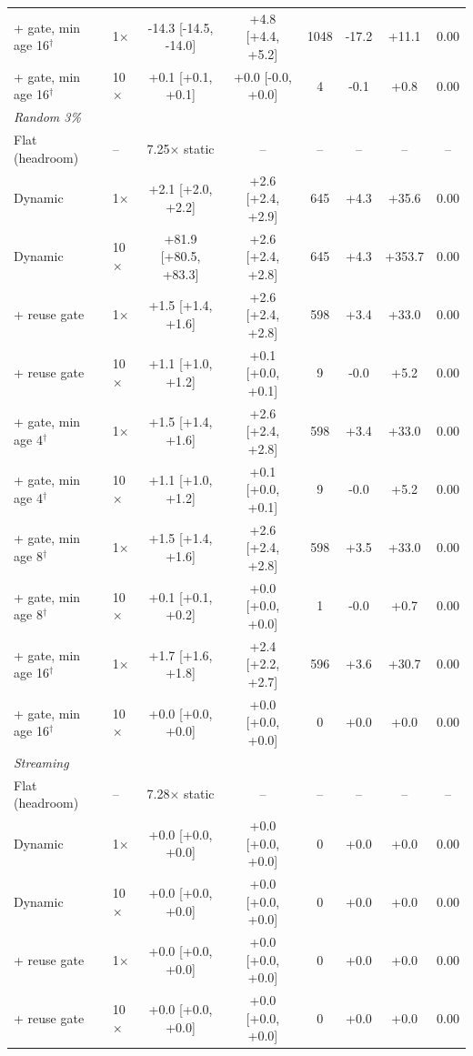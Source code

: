 \begin{table}[h]
\begin{tabular}{llcccccc}
\quad + gate, min age 16$^\dagger$ & 1$\times$ & -14.3 [-14.5, -14.0] & +4.8 [+4.4, +5.2] & 1048 & -17.2 & +11.1 & 0.00\\
\quad + gate, min age 16$^\dagger$ & 10$\times$ & +0.1 [+0.1, +0.1] & +0.0 [-0.0, +0.0] & 4 & -0.1 & +0.8 & 0.00\\
\midrule
\multicolumn{8}{l}{\textit{Random 3\%}}\\
\quad Flat (headroom) & -- & 7.25$\times$ static & -- & -- & -- & -- & --\\
\quad Dynamic & 1$\times$ & +2.1 [+2.0, +2.2] & +2.6 [+2.4, +2.9] & 645 & +4.3 & +35.6 & 0.00\\
\quad Dynamic & 10$\times$ & +81.9 [+80.5, +83.3] & +2.6 [+2.4, +2.8] & 645 & +4.3 & +353.7 & 0.00\\
\quad + reuse gate & 1$\times$ & +1.5 [+1.4, +1.6] & +2.6 [+2.4, +2.8] & 598 & +3.4 & +33.0 & 0.00\\
\quad + reuse gate & 10$\times$ & +1.1 [+1.0, +1.2] & +0.1 [+0.0, +0.1] & 9 & -0.0 & +5.2 & 0.00\\
\quad + gate, min age 4$^\dagger$ & 1$\times$ & +1.5 [+1.4, +1.6] & +2.6 [+2.4, +2.8] & 598 & +3.4 & +33.0 & 0.00\\
\quad + gate, min age 4$^\dagger$ & 10$\times$ & +1.1 [+1.0, +1.2] & +0.1 [+0.0, +0.1] & 9 & -0.0 & +5.2 & 0.00\\
\quad + gate, min age 8$^\dagger$ & 1$\times$ & +1.5 [+1.4, +1.6] & +2.6 [+2.4, +2.8] & 598 & +3.5 & +33.0 & 0.00\\
\quad + gate, min age 8$^\dagger$ & 10$\times$ & +0.1 [+0.1, +0.2] & +0.0 [+0.0, +0.0] & 1 & -0.0 & +0.7 & 0.00\\
\quad + gate, min age 16$^\dagger$ & 1$\times$ & +1.7 [+1.6, +1.8] & +2.4 [+2.2, +2.7] & 596 & +3.6 & +30.7 & 0.00\\
\quad + gate, min age 16$^\dagger$ & 10$\times$ & +0.0 [+0.0, +0.0] & +0.0 [+0.0, +0.0] & 0 & +0.0 & +0.0 & 0.00\\
\midrule
\multicolumn{8}{l}{\textit{Streaming}}\\
\quad Flat (headroom) & -- & 7.28$\times$ static & -- & -- & -- & -- & --\\
\quad Dynamic & 1$\times$ & +0.0 [+0.0, +0.0] & +0.0 [+0.0, +0.0] & 0 & +0.0 & +0.0 & 0.00\\
\quad Dynamic & 10$\times$ & +0.0 [+0.0, +0.0] & +0.0 [+0.0, +0.0] & 0 & +0.0 & +0.0 & 0.00\\
\quad + reuse gate & 1$\times$ & +0.0 [+0.0, +0.0] & +0.0 [+0.0, +0.0] & 0 & +0.0 & +0.0 & 0.00\\
\quad + reuse gate & 10$\times$ & +0.0 [+0.0, +0.0] & +0.0 [+0.0, +0.0] & 0 & +0.0 & +0.0 & 0.00\\
\bottomrule
\end{tabular}
\end{table}
